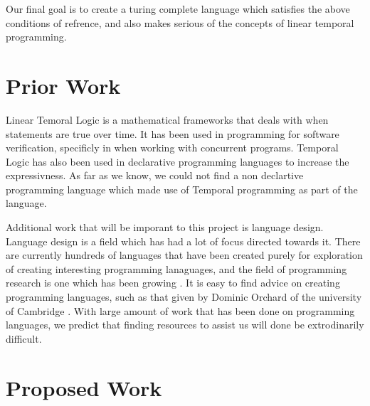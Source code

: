 \documentclass[numbers]{sigplanconf}
\begin{document}
Our final goal is to create a turing complete language which satisfies
the above conditions of refrence, and also makes serious of the
concepts of linear temporal programming.

\section{Prior Work}
 

Linear Temoral Logic is a mathematical frameworks that deals with when
statements are true over time. It has been used in programming for
software verification, specificly in when working with concurrent
programs\cite{AutomaticVerification, SimpleVerification}. Temporal
Logic has also been used in declarative programming languages to
increase the expressivness\cite{DeclarativeTemporal}. As far as we
know, we could not find a non declartive programming language which
made use of Temporal programming as part of the language. 

Additional work that will be imporant to this project is language design.
Language design is a field which has had a lot of focus directed
towards it. There are currently hundreds of languages that
have been created purely for exploration of creating interesting
programming lanaguages, and the field of programming research is one
which has been growing \cite{esolang}. It is easy to find advice on
creating programming languages, such as that given by Dominic Orchard
of the university of Cambridge \cite{4Rs}.  With large amount of work
that has been done on programming languages, we predict that finding
resources to assist us will done be extrodinarily difficult.

\section{Proposed Work}
\end{document}

